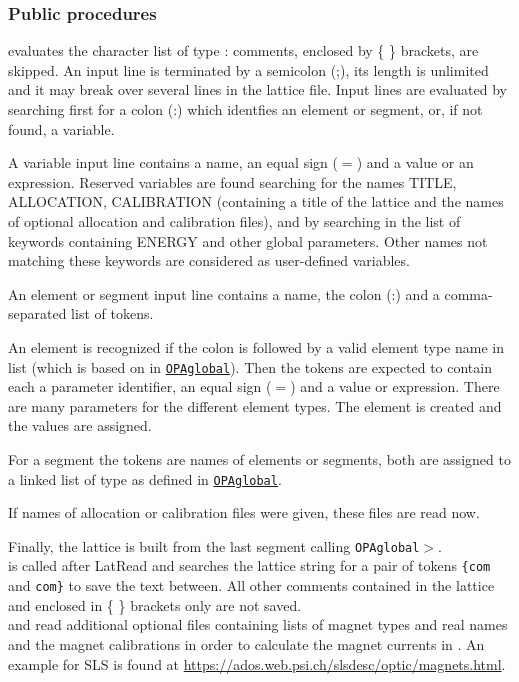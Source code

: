 \documentclass[12pt]{article}
\newcommand\code[1]{{\tt #1}}
\newcommand\guico[1]{{\color{blue}\code{#1}}}
\newcommand{\unico}[1]{{\color{burntorange}\code{#1}}}
\newcommand{\prcod}[2]{\opauni{#1}$>$\unico{#2}}
\newcommand{\opauni}[1]{\colorbox{orange!30}{\code{#1}}}
\newcommand{\ouni}[1]{\hyperref[#1]{\opauni{#1}}}
\newcommand{\ppro}[1]{\subsubsection*{Public procedures} #1}
\begin{document}
\ppro{
\unico{Latread} evaluates the character list of type \unico{TextBuffer}: comments, enclosed by \{ \} brackets, are skipped. An input line is terminated by a semicolon (;), its length is unlimited and it may break over several lines in the lattice file.  Input lines are evaluated by searching first for a colon (:) which identfies an element or segment, or, if not found, a variable.

A variable input line contains a name, an equal sign ($=$) and a value or an expression.
Reserved variables are found searching for the names TITLE, ALLOCATION, CALIBRATION (containing a title of the lattice and the names of optional allocation and calibration files), and by searching in the list of keywords \unico{globkeyw} containing ENERGY and other global parameters. Other names not matching these keywords are considered as user-defined variables.

An element or segment input line contains a name, the colon (:) and a comma-separated list of tokens.

An element is recognized if the colon is followed by a valid element type name in list \unico{elemkeyw} (which is based on \unico{ElemName} in \ouni{OPAglobal}). Then the tokens are expected to contain each a parameter identifier, an equal sign ($=$) and a value or expression. There are many parameters for the different element types. The element is created and the values are assigned.

For a segment the tokens are names of elements or segments, both are  assigned to a linked list of type \unico{AbstractEleType} as defined in \ouni{OPAglobal}.

If names of allocation or calibration files were given, these files are read now.

Finally, the lattice is built from the last segment calling \prcod{OPAglobal}{MakeLattice}.\\


\unico{LatReadCom} is called after LatRead and searches the lattice string for a pair of tokens \code{\{com} and \code{com\}} to save the text between. All other comments contained in the lattice and enclosed in \{ \} brackets only are not saved.\\

\unico{ReadAllocation} and \unico{ReadCalibration} read additional optional files containing lists of magnet types and real names and the magnet calibrations in order to calculate the magnet currents in \guico{OPACurrents}. 
An example for SLS is found at \url{https://ados.web.psi.ch/slsdesc/optic/magnets.html}. 

}
\end{document}
